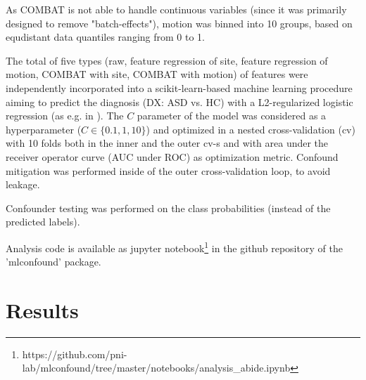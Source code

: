 \documentclass{article}
\begin{document}
As COMBAT is not able to handle continuous variables (since it was primarily designed to remove "batch-effects"), motion was binned into 10 groups, based on equdistant data quantiles ranging from 0 to 1.

The total of five types (raw, feature regression of site, feature regression of motion, COMBAT with site, COMBAT with motion) of features were independently incorporated into a scikit-learn-based \citep{pedregosa2011scikit} machine learning procedure aiming to predict the diagnosis (DX: ASD vs. HC) with a L2-regularized logistic regression (as e.g. in \citep{dadi2019benchmarking}). The $C$ parameter of the model was considered as a hyperparameter ($C \in \{0.1, 1, 10\}$) and optimized in a nested cross-validation (cv) with 10 folds both in the inner and the outer cv-s and with area under the receiver operator curve (AUC under ROC) as optimization metric. Confound mitigation was performed inside of the outer cross-validation loop, to avoid leakage.

Confounder testing was performed on the class probabilities (instead of the predicted labels).

Analysis code is available as jupyter notebook\footnote{https://github.com/pni-lab/mlconfound/tree/master/notebooks/analysis\_abide.ipynb} in the github repository of the 'mlconfound' package.

\section{Results}
\end{document}
